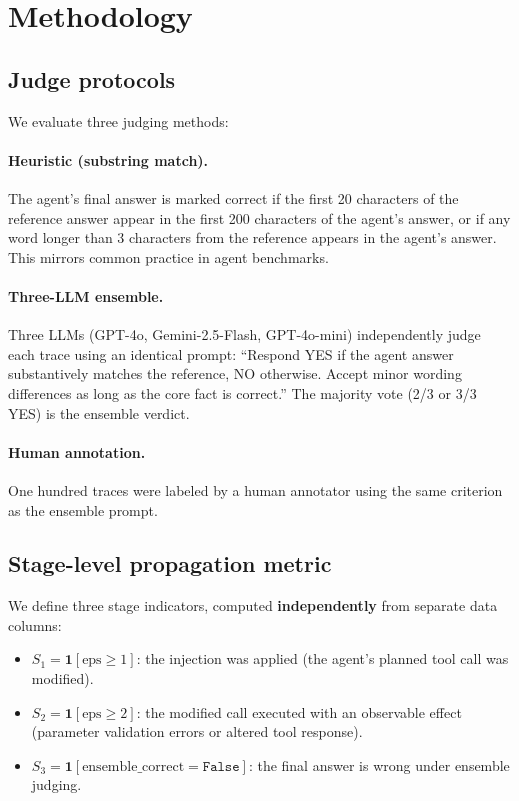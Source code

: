 \documentclass[preprint,review,12pt,3p]{elsarticle}
\newcommand{\ind}{\mathbf{1}}
\begin{document}
\section{Methodology}
\label{sec:method}

\subsection{Judge protocols}

We evaluate three judging methods:

\paragraph{Heuristic (substring match).}
The agent's final answer is marked correct if the first 20 characters
of the reference answer appear in the first 200 characters of the
agent's answer, or if any word longer than 3 characters from the
reference appears in the agent's answer.
This mirrors common practice in agent benchmarks.

\paragraph{Three-LLM ensemble.}
Three LLMs (GPT-4o, Gemini-2.5-Flash, GPT-4o-mini) independently
judge each trace using an identical prompt: ``Respond YES if the agent
answer substantively matches the reference, NO otherwise.
Accept minor wording differences as long as the core fact is correct.''
The majority vote (2/3 or 3/3 YES) is the ensemble verdict.

\paragraph{Human annotation.}
One hundred traces were labeled by a human annotator using the same
criterion as the ensemble prompt.

\subsection{Stage-level propagation metric}
\label{sec:stagedef}

We define three stage indicators, computed \textbf{independently} from
separate data columns:
\begin{itemize}
  \item $S_1 = \ind[\text{eps} \geq 1]$: the injection was applied
    (the agent's planned tool call was modified).
  \item $S_2 = \ind[\text{eps} \geq 2]$: the modified call executed
    with an observable effect (parameter validation errors or altered
    tool response).
  \item $S_3 = \ind[\text{ensemble\_correct} = \texttt{False}]$: the
    final answer is wrong under ensemble judging.
\end{itemize}
\end{document}
